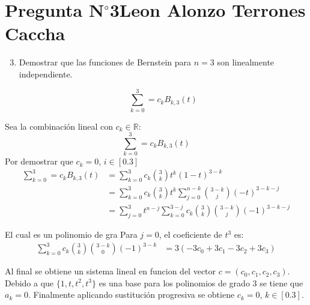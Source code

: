 \section{Pregunta N$^{\circ}$3\qquad Leon Alonzo Terrones Caccha}

\begin{frame}
    \begin{enumerate}\setcounter{enumi}{2}
        \item
              Demostrar que las funciones de Bernstein para $n=3$ son linealmente independiente.

              \[\sum_{k=0}^{3}=c_{k}B_{k,3}(t)\]

    \end{enumerate}

    \begin{solution}
        Sea la combinación lineal con $c_k\in\mathbb{R}:$
        \[\sum_{k=0}^{3}=c_{k}B_{k,3}(t)\]
        Por demostrar que $c_k=0$, $i\in[0.3]$
        \begin{align*}
            \sum_{k=0}^{3}=c_{k}B_{k,3}(t) & =\sum_{k=0}^{3}c_k\binom{3}{k}t^k(1-t)^{3-k}                                        \\
                                           & =\sum_{k=0}^{3}{c_k\binom{3}{k}t^k\sum_{j=0}^{n-k}\binom{3-k}{j}{(-t)^{3-k-j}}}     \\
                                           & =\sum_{j=0}^{3}{t^{n-j}\sum_{k=0}^{3-j}{c_k\binom{3}{k}\binom{3-k}{j}(-1)^{3-k-j}}}
        \end{align*}

        El cual es un polinomio de gra
        Para $j=0$, el coeficiente de $t^3$ es:
        \begin{align*}
            \sum_{k=0}^{3}{c_k\binom{3}{k}\binom{3-k}{0}(-1)^{3-k}} & =3(-3c_0+3c_1-3c_2+3c_3)
        \end{align*}
    \end{solution}
\end{frame}

\begin{frame}
    \begin{solution}
        Al final se obtiene un sistema lineal en funcion del vector $c=(c_0,c_1,c_2,c_3)$. Debido a que $\{1,t,t^2,t^3\}$ es una base para los polinomios de grado 3 se tiene que $a_k=0$. Finalmente aplicando sustitución progresiva se obtiene $c_k=0$, $k\in[0.3]$.
    \end{solution}
\end{frame}
